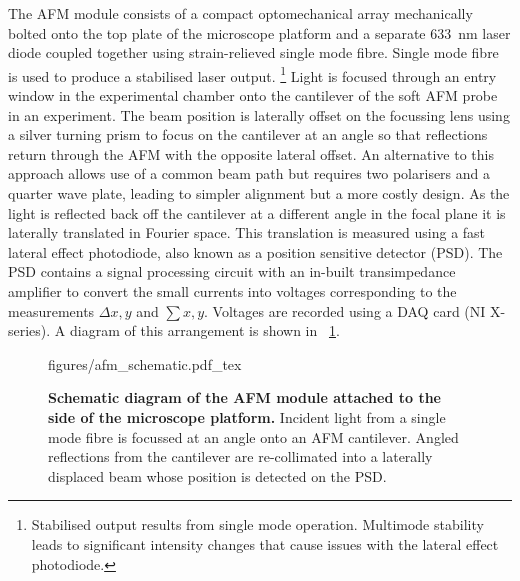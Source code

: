 \documentclass{article}
\begin{document}
The AFM module consists of a compact optomechanical {\color{red}array} mechanically bolted onto the top plate of the microscope platform and a separate \SI{633}{nm} laser diode coupled together using strain-relieved single mode fibre. Single mode fibre is used to produce a stabilised laser output.%
\footnote{Stabilised output results from single mode operation. Multimode stability leads to significant intensity changes that cause issues with the lateral effect photodiode.}
Light is focused through an entry window in the experimental chamber onto the cantilever of the soft AFM probe in an experiment. The beam position is laterally offset on the focussing lens using a silver turning prism to focus on the cantilever at an angle so that reflections return through the AFM with the opposite lateral offset. An alternative to this approach allows use of a common beam path but requires two polarisers and a quarter wave plate, leading to simpler alignment but a more costly design. As the light is reflected back off the cantilever at a different angle in the focal plane it is laterally translated in Fourier space. This translation is measured using a fast lateral effect photodiode, also known as a position sensitive detector (PSD). The PSD contains a signal processing circuit with an in-built transimpedance amplifier to convert the small currents into voltages corresponding to the measurements $\Delta x,y$ and $\sum x,y$. Voltages are recorded using a DAQ card (NI X-series). A diagram of this arrangement is shown in \figurename~\ref{fig:afm_design}.

\begin{figure}[bt]
\centering
{\fontsize{9.5pt}{1em}\selectfont
\def\svgwidth{0.8\textwidth}
{figures/afm_schematic.pdf_tex}}
\caption[Schematic diagram of the AFM module.]{\textbf{Schematic diagram of the AFM module attached to the side of the microscope platform.} Incident light from a single mode fibre is focussed at an angle onto an AFM cantilever. Angled reflections from the cantilever are re-collimated into a laterally displaced beam whose position is detected on the PSD.}
\label{fig:afm_design}
\end{figure}
\end{document}
